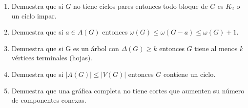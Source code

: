 \documentclass{article}
\begin{document}
	\begin{enumerate}
		\item{Demuestra que si $G$ no tiene ciclos pares entonces todo bloque de $G$ es $K_2$ o un ciclo impar.}
		\item{Demuestra que si $a \in A(G)$ entonces $\omega(G) \leq \omega(G - a) \leq \omega(G) + 1$. }
		\item{Demuestra  que si G es un árbol con $\Delta(G) \geq k$ entonces $G$ tiene al menos $k$ vértices terminales (hojas).}
		\item{Demuestra que si $|A(G)|  \leq  |V(G)|$ entonces $G$ contiene un ciclo.}
		\item{Demuestra que una gráfica completa no tiene cortes que aumenten su número de componentes conexas.}
	\end{enumerate}
\end{document}
